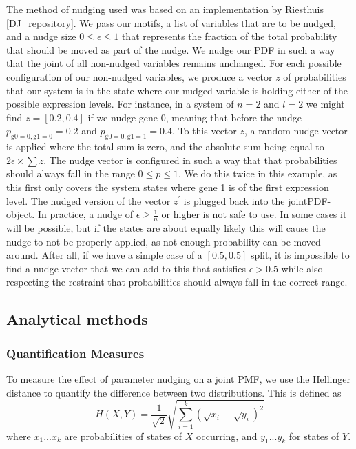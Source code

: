 \documentclass[../main.tex]{subfiles}
\begin{document}
The method of nudging used was based on an implementation by Riesthuis \ref{DJ_repository}.
We pass our motifs, a list of variables that are to be nudged, and a nudge size $0 \le \epsilon \le 1$ that represents the fraction of the total probability that should be moved as part of the nudge.
We nudge our PDF in such a way that the joint of all non-nudged variables remains unchanged.
For each possible configuration of our non-nudged variables, we produce a vector $z$ of probabilities that our system is in the state where our nudged variable is holding either of the possible expression levels.
For instance, in a system of $n=2$ and $l=2$ we might find $z = [0.2, 0.4]$ if we nudge gene 0, meaning that before the nudge $p_\mathrm{g0 = 0, g1=0} = 0.2$ and $p_\mathrm{g0 = 0, g1=1} = 0.4$.
To this vector $z$, a random nudge vector is applied where the total sum is zero, and the absolute sum being equal to $2 \epsilon \times \sum z$.
The nudge vector is configured in such a way that that probabilities should always fall in the range $0 \le p \le 1$.
We do this twice in this example, as this first only covers the system states where gene 1 is of the first expression level.
The nudged version of the vector $z^\prime$ is plugged back into the jointPDF-object.
In practice, a nudge of $\epsilon \ge \frac{1}{n}$ or higher is not safe to use.
In some cases it will be possible, but if the states are about equally likely this will cause the nudge to not be properly applied, as not enough probability can be moved around.
After all, if we have a simple case of a $[0.5, 0.5]$ split, it is impossible to find a nudge vector that we can add to this that satisfies $\epsilon > 0.5$ while also respecting the restraint that probabilities should always fall in the correct range.

\subsection{Analytical methods}

\subsubsection{Quantification Measures}

To measure the effect of parameter nudging on a joint PMF, we use the Hellinger distance to quantify the difference between two distributions.
This is defined as
%
\begin{equation}
H(X, Y) = \frac{1}{\sqrt{2}} \sqrt{\sum^k_{i=1} (\sqrt{x_i} - \sqrt{y_i})^2}
\end{equation}
%
where ${x_1 ... x_k}$ are probabilities of states of $X$ occurring, and ${y_1 ... y_k}$ for states of $Y$.
\end{document}
